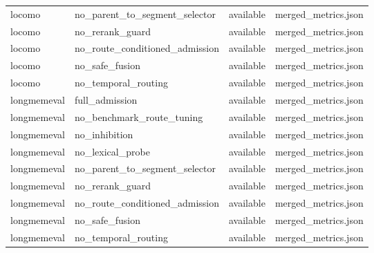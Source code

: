 \begin{tabular}{llll}
locomo & no_parent_to_segment_selector & available & merged_metrics.json \\
locomo & no_rerank_guard & available & merged_metrics.json \\
locomo & no_route_conditioned_admission & available & merged_metrics.json \\
locomo & no_safe_fusion & available & merged_metrics.json \\
locomo & no_temporal_routing & available & merged_metrics.json \\
longmemeval & full_admission & available & merged_metrics.json \\
longmemeval & no_benchmark_route_tuning & available & merged_metrics.json \\
longmemeval & no_inhibition & available & merged_metrics.json \\
longmemeval & no_lexical_probe & available & merged_metrics.json \\
longmemeval & no_parent_to_segment_selector & available & merged_metrics.json \\
longmemeval & no_rerank_guard & available & merged_metrics.json \\
longmemeval & no_route_conditioned_admission & available & merged_metrics.json \\
longmemeval & no_safe_fusion & available & merged_metrics.json \\
longmemeval & no_temporal_routing & available & merged_metrics.json \\
\bottomrule
\end{tabular}

